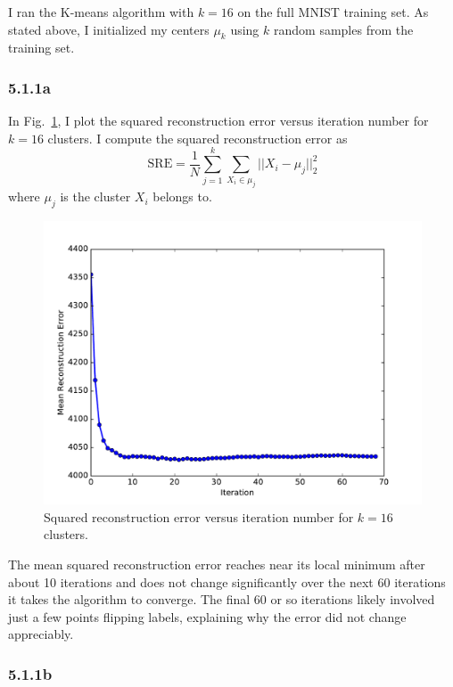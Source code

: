 \documentclass[12pt]{amsart}
\begin{document}
I ran the K-means algorithm with $k = 16$ on the full MNIST training set.  As stated above, I initialized my centers $\mu_k$ using $k$ random samples from the training set.

\subsubsection*{5.1.1a}

In Fig.~\ref{fig:k_16_rec_err}, I plot the squared reconstruction error versus iteration number for $k = 16$ clusters.  I compute the squared reconstruction error as
\begin{equation} \label{eqn:sq_rec_err}
\text{SRE} = \frac{1}{N} \sum_{j = 1}^k\sum_{X_i \in \mu_j} || X_i - \mu_j ||_2^2
\end{equation}
where $\mu_j$ is the cluster $X_i$ belongs to.

\begin{figure}[H]
	\includegraphics[width=\columnwidth]{k_16_rec_err.pdf}
    \caption{Squared reconstruction error versus iteration number for $k = 16$ clusters.}
    \label{fig:k_16_rec_err}
\end{figure}

The mean squared reconstruction error reaches near its local minimum after about 10 iterations and does not change significantly over the next 60 iterations it takes the algorithm to converge.  The final 60 or so iterations likely involved just a few points flipping labels, explaining why the error did not change appreciably.

\subsubsection*{5.1.1b}
\end{document}
